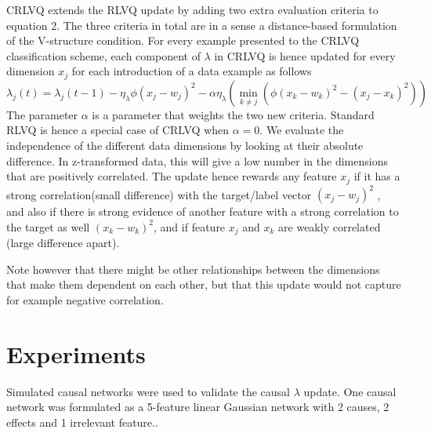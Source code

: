 \documentclass{esannV2}
\begin{document}
CRLVQ extends the RLVQ update by adding two extra evaluation criteria to equation 2. The three criteria in total are in a sense a distance-based formulation of the V-structure condition. For every example presented to the CRLVQ classification scheme, each component of $\lambda$ in CRLVQ is hence updated for every dimension $x_j$ for each introduction of a data example as follows
%
\begin{equation} 
\lambda_j(t) = \lambda_j(t-1) - \eta_\lambda \phi (x_j - w_j)^2 - \alpha \eta_\lambda \left( \min_{k \neq j}\left(\phi (x_k - w_k)^2 - (x_j - x_k)^2 \right) \right)
\end{equation}
%
The parameter $\alpha$ is a parameter that weights the two new criteria. Standard RLVQ is hence a special case of CRLVQ when $\alpha = 0$. We evaluate the independence of the different data dimensions by looking at their absolute difference. In z-transformed data, this will give a low number in the dimensions that are positively correlated. The update hence rewards any feature $x_j$ if it has a strong correlation(small difference) with the target/label vector $(x_j - w_j)^2$ , and also if there is strong evidence of another feature with a strong correlation to the target as well $(x_k - w_k)^2$, and if feature $x_j$ and $x_k$ are weakly correlated (large difference apart).

Note however that there might be other relationships between the dimensions that make them dependent on each other, but that this update would not capture for example negative correlation. 

\section{Experiments}
\label{sec:Experiments}

Simulated causal networks were used to validate the causal $\lambda$ update. One causal network was formulated as a 5-feature linear Gaussian network with 2 causes, 2 effects and 1 irrelevant feature.. 
\end{document}
